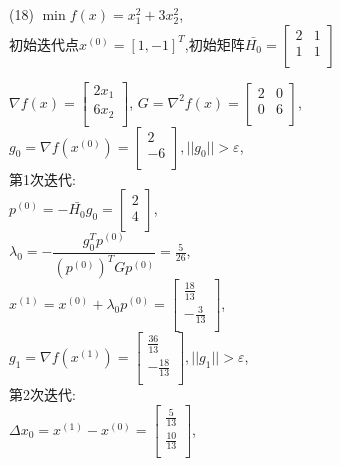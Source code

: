 \begin{problem}{(18)}
    $\min f(x)=x_1^2+3x_2^2$,\\
    初始迭代点${x^{(0)}}=[1,-1]^T$,初始矩阵$\bar{H_0}=\begin{bmatrix}
        2 & 1  \\
        1 & 1  \\
    \end{bmatrix}$
\end{problem}
\begin{solution}
    $\nabla f(x)=\begin{bmatrix}
        2x_1  \\
        6x_2  \\
    \end{bmatrix}$,
    $G=\nabla^2 f(x)=\begin{bmatrix}
        2 & 0  \\
        0 & 6  \\
    \end{bmatrix}$,\\
    $g_0=\nabla f(x^{(0)})=\begin{bmatrix} 2\\-6\\\end{bmatrix},||g_0||>\varepsilon$,\\
    第1次迭代:\\
    $p^{(0)}=-\bar{H_0}g_0=\begin{bmatrix} 2\\4\\\end{bmatrix}$,\\
    $\lambda_0=-\dfrac{g_0^Tp^{(0)}}{(p^{(0)})^TGp^{(0)}}=\frac{5}{26}$,\\
    $x^{(1)}=x^{(0)}+\lambda_0p^{(0)}=\begin{bmatrix} \frac{18}{13}\\-\frac{3}{13}\\\end{bmatrix}$,\\
    $g_1=\nabla f(x^{(1)})=\begin{bmatrix} \frac{36}{13}\\-\frac{18}{13}\\\end{bmatrix},||g_1||>\varepsilon$,\\
    第2次迭代:\\
    $\Delta x_0=x^{(1)}-x^{(0)}=\begin{bmatrix} \frac{5}{13}\\\frac{10}{13}\\\end{bmatrix}$,\\

\end{solution}
